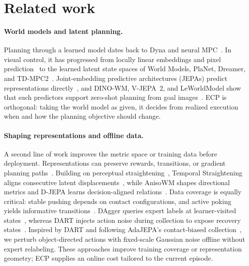 \section{Related work}
\label{sec:related}
\paragraph{World models and latent planning.}
Planning through a learned model dates back to Dyna and neural MPC~\cite{sutton1991dyna,nagabandi2018neural,chua2018pets}. In visual control, it has progressed from locally linear embeddings and pixel prediction~\cite{watter2015embed,finn2017foresight} to the learned latent state spaces of World Models, PlaNet, Dreamer, and TD-MPC2~\cite{ha2018worldmodels,hafner2019planet,hafner2020dreamer,hansen2024tdmpc2}. Joint-embedding predictive architectures (JEPAs) predict representations directly~\cite{assran2023ijepa,bardes2024vjepa,balestriero2025lejepa}, and DINO-WM, V-JEPA~2, and LeWorldModel show that such predictors support zero-shot planning from goal images~\cite{zhou2025dinowm,assran2025vjepa2,maes2026lewm}. ECP is orthogonal: taking the world model as given, it decides from realized execution when and how the planning objective should change.

\paragraph{Shaping representations and offline data.}
A second line of work improves the metric space or training data before deployment. Representations can preserve rewards, transitions, or gradient planning paths~\cite{gelada2019deepmdp,farahmand2017valueaware,srinivas2018upn}. Building on perceptual straightening~\cite{henaff2019straightening}, Temporal Straightening aligns consecutive latent displacements~\cite{wang2026straightening}, while AnisoWM shapes directional metrics and D-JEPA learns decision-aligned relations~\cite{kang2026anisowm,liu2026djepa}. Data coverage is equally critical: stable pushing depends on contact configurations, and active poking yields informative transitions~\cite{lynch1996pushing,agrawal2016poking,yu2016pushing}. DAgger queries expert labels at learner-visited states~\cite{ross2011dagger}, whereas DART injects action noise during collection to expose recovery states~\cite{laskey2017dart}. Inspired by DART and following AdaJEPA's contact-biased collection~\cite{wang2026adajepa}, we perturb object-directed actions with fixed-scale Gaussian noise offline without expert relabeling. These approaches improve training coverage or representation geometry; ECP supplies an online cost tailored to the current episode.

